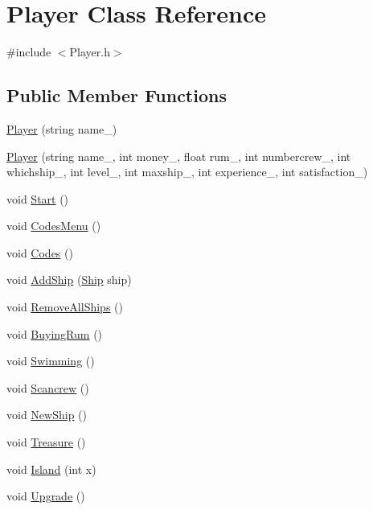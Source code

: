 \hypertarget{class_player}{}\section{Player Class Reference}
\label{class_player}


{\ttfamily \#include $<$Player.\+h$>$}

\subsection*{Public Member Functions}
\begin{DoxyCompactItemize}
\item 
\hyperlink{class_player_a3c3ccb417f0a1afa1efdc882a8097718}{Player} (string name\+\_\+)
\item 
\hyperlink{class_player_a32efbe7a5af55d105409031f5706cd0f}{Player} (string name\+\_\+, int money\+\_\+, float rum\+\_\+, int numbercrew\+\_\+, int whichship\+\_\+, int level\+\_\+, int maxship\+\_\+, int experience\+\_\+, int satisfaction\+\_\+)
\item 
void \hyperlink{class_player_a54de25087f17985430c4316bf5a7f368}{Start} ()
\item 
void \hyperlink{class_player_a28e5f8eafd2b969be00a75d9acde3693}{Codes\+Menu} ()
\item 
void \hyperlink{class_player_ac83f16a857e7af30ea9cb10d268f5e97}{Codes} ()
\item 
void \hyperlink{class_player_a57f5ee759da818da979fec48084c1551}{Add\+Ship} (\hyperlink{class_ship}{Ship} ship)
\item 
void \hyperlink{class_player_ae10e677107b02aba1e5e3626d3138abf}{Remove\+All\+Ships} ()
\item 
void \hyperlink{class_player_a9a02542fcb29f6facb130883cfb1bbed}{Buying\+Rum} ()
\item 
void \hyperlink{class_player_a254328ae8a844fcbc54fe6f159e02131}{Swimming} ()
\item 
void \hyperlink{class_player_aca8061cbd726027026078362a7864fc9}{Scancrew} ()
\item 
void \hyperlink{class_player_a235e967a3d74eeb64f983cf8a6db3272}{New\+Ship} ()
\item 
void \hyperlink{class_player_adeae433538eda671f1cbaaf3fce54380}{Treasure} ()
\item 
void \hyperlink{class_player_afc2b87dc8abe8dfc5ea7f62503e18810}{Island} (int x)
\item 
void \hyperlink{class_player_af928618a2b86138724fe0a523d8aa213}{Upgrade} ()

\end{DoxyCompactItemize}
